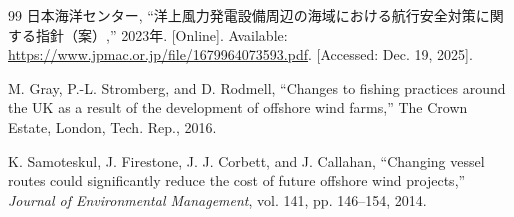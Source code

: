 \begin{thebibliography}{99}
日本海洋センター, ``洋上風力発電設備周辺の海域における航行安全対策に関する指針（案）,'' 2023年. [Online]. Available: \url{https://www.jpmac.or.jp/file/1679964073593.pdf}. [Accessed: Dec. 19, 2025].

M. Gray, P.-L. Stromberg, and D. Rodmell, ``Changes to fishing practices around the UK as a result of the development of offshore wind farms,'' The Crown Estate, London, Tech. Rep., 2016.

K. Samoteskul, J. Firestone, J. J. Corbett, and J. Callahan, ``Changing vessel routes could significantly reduce the cost of future offshore wind projects,'' \textit{Journal of Environmental Management}, vol. 141, pp. 146--154, 2014.







\end{thebibliography}
